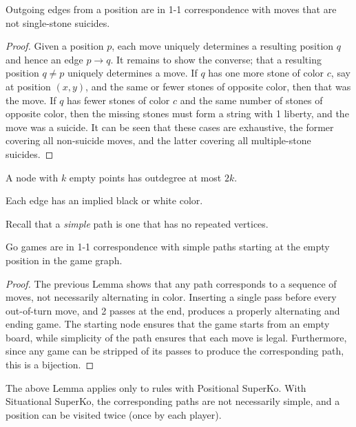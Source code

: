 \documentclass{article}
\begin{document}
\begin{lemma}
Outgoing edges from a position are in 1-1 correspondence with moves
that are not single-stone suicides.
\label{movesedges}
\end{lemma}

\begin{proof}
Given a position $p$, each move uniquely determines
a resulting position $q$ and hence an edge $p \rightarrow q$.
It remains to show the converse;
that a resulting position $q \neq p$ uniquely determines a move.
If $q$ has one more stone of color $c$, say at position $(x,y)$,
and the same or fewer stones of opposite color, then that was the move.
If $q$ has fewer stones of color $c$ and the same number of stones
of opposite color, then the missing stones must form a string with
1 liberty, and the move was a suicide.
It can be seen that these cases are exhaustive, the former covering
all non-suicide moves, and the latter covering all multiple-stone suicides.
\end{proof}

\begin{coro}
\label{outdeg}
A node with $k$ empty points has outdegree at most $2k$.
\end{coro}

\begin{coro}
Each edge has an implied black or white color.
\end{coro}

Recall that a {\em simple} path is one that has no
repeated vertices.

\begin{lemma}
\label{gamepaths}
Go games are in 1-1 correspondence with simple paths
starting at the empty position in the game graph.
\end{lemma}

\begin{proof}
The previous Lemma shows that any path corresponds to a sequence
of moves, not necessarily alternating in color.
Inserting a single pass before every out-of-turn move,
and 2 passes at the end, produces a properly alternating and ending game.
The starting node ensures that the game starts from an empty board,
while simplicity of the path ensures that each move is legal.
Furthermore, since any game can be stripped of its
passes to produce the corresponding path, this is a bijection.
\end{proof}

The above Lemma applies only to rules with Positional SuperKo.
With Situational SuperKo, the corresponding paths are not necessarily
simple, and a position can be visited twice (once by each player).
\end{document}
